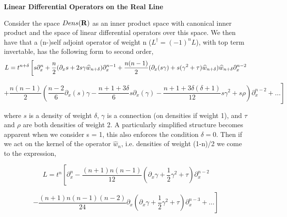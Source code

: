 
\def\vare {\varepsilon}
\def\A {{\bf A}}
\def\t {\tilde}
\def\a {\alpha}
\def\K {{\bf K}}
\def\N {{\bf N}}
\def\V {{\cal V}}
\def\s {{\sigma}}
\def\S {{\Sigma}}
\def\s {{\sigma}}
\def\p{\partial}
\def\vare{{\varepsilon}}
\def\Q {{\bf Q}}
\def\D {{\cal D}}
\def\G {{\Gamma}}
\def\C {{\bf C}}
\def\M {{\cal M}}
\def\Z {{\bf Z}}
\def\U  {{\cal U}}
\def\H {{\cal H}}
\def\R  {{\bf R}}
\def\S  {{\bf S}}
\def\E  {{\bf E}}
\def\l {\lambda}
\def\degree {{\bf {\rm degree}\,\,}}
\def \finish {${\,\,\vrule height1mm depth2mm width 8pt}$}
\def \m {\medskip}
\def\p {\partial}
\def\r {{\bf r}}
\def\v {{\bf v}}
\def\n {{\bf n}}
\def\t {{\bf t}}
\def\b {{\bf b}}
\def\c {{\bf c }}
\def\e{{\bf e}}
\def\ac {{\bf a}}
\def \X   {{\bf X}}
\def \Y   {{\bf Y}}
\def \x   {{\bf x}}
\def \y   {{\bf y}}
\def \G{{\cal G}}
\def \F {{\cal F}}

\centerline {\bf Linear Differential Operators on the Real Line}




Consider the space $Dens({\bf R})$ as an inner product space with canonical inner product and the space of linear differential operators over this space. We then have that a (n-)self adjoint operator of weight n ($L^{\dagger} = (-1)^{n}L$), with top term invertable, has the following form to second order,
                  $$
L  = t^{n+\delta} \left[ s \p_{x}^{n} + {n\over 2}(\partial_{x} s + 2 s \gamma \widehat{w}_{n+\delta})\partial_{x}^{n-1} + {n(n-1)\over 2}(\partial_{x}(s\gamma) + s(\gamma^{2} + \tau)\widehat{w}_{n+\delta})\widehat{w}_{n+\delta}\partial_{x}^{n-2} \right.
          $$ \bye

\[ \left. + \frac{n(n-1)}{2} \left( \frac{n-2}{6}\partial_{x}(s)\gamma - \frac{n+1+3\delta}{6}s \partial_{x}(\gamma) - \frac{n+1 + 3\delta(\delta+1)}{12}s\gamma^{2} + s \rho \right) \partial_{x}^{n-2} + ... \right] \]

where $s$ is a density of weight $\delta$, $\gamma$ is a connection (on densities if weight 1), and $\tau$ and $\rho$ are both densities of weight 2. A particularly simplified structure becomes apparent when we consider s = 1, this also enforces the condition $\delta = 0$. Then if we act on the kernel of the operator $\widehat{w}_{n}$, i.e. densities of weight (1-n)/2 we come to the expression,

\[ L = t^{n} \left[ \partial_{x}^{n} - \frac{(n+1)n(n-1)}{12}( \partial_{x} \gamma + \frac{1}{2} \gamma^{2} + \tau ) \partial_{x}^{n-2} \right. \]

\[ \left. - \frac{(n+1)n(n-1)(n-2)}{24}\partial_{x}(\partial_{x}\gamma + \frac{1}{2}\gamma^{2} + \tau)\partial_{x}^{n-3} + ... \right] \]


